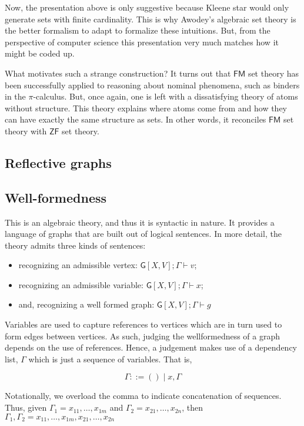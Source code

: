 Now, the presentation above is only suggestive because Kleene star
would only generate sets with finite cardinality. This is why Awodey's
algebraic set theory is the better formalism to adapt to formalize
these intuitions. But, from the perspective of computer science this
presentation very much matches how it might be coded up.

What motivates such a strange construction? It turns out that
$\mathsf{FM}$ set theory has been successfully applied to reasoning
about nominal phenomena, such as binders in the $\pi$-calculus. But,
once again, one is left with a dissatisfying theory of atoms without
structure. This theory explains where atoms come from and how they can
have exactly the same structure as sets. In other words, it reconciles
$\mathsf{FM}$ set theory with $\mathsf{ZF}$ set theory.

\subsection{Reflective graphs}

\subsection{Well-formedness}

This is an algebraic theory, and thus it is syntactic in nature. It
provides a language of graphs that are built out of logical sentences.
In more detail, the theory admits three kinds of sentences:

\begin{itemize}
\item
  recognizing an admissible vertex:
  \(\mathsf{G}[X,V]; \Gamma \vdash v\);
\item
  recognizing an admissible variable:
  \(\mathsf{G}[X,V]; \Gamma \vdash x\);
\item
  and, recognizing a well formed graph:
  \(\mathsf{G}[X,V]; \Gamma \vdash g\)
\end{itemize}

Variables are used to capture references to vertices which are in turn
used to form edges between vertices. As such, judging the wellformedness
of a graph depends on the use of references. Hence, a judgement makes
use of a dependency list, \(\Gamma\) which is just a sequence of
variables. That is,

\[\Gamma ::= () \;|\; x, \Gamma\]

Notationally, we overload the comma to indicate concatenation of
sequences. Thus, given \(\Gamma_1 = x_{11},\ldots,x_{1m}\) and
\(\Gamma_2 = x_{21},\ldots,x_{2n}\), then
\(\Gamma_1,\Gamma_2 = x_{11},\ldots,x_{1m},x_{21},\ldots,x_{2n}\)

